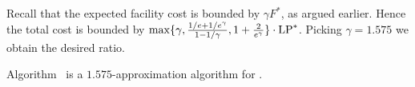 Recall that the expected facility cost is bounded by $\gamma F^\ast$,
as argued earlier. Hence the total cost is bounded by $\max\{\gamma,
\frac{1/e+1/e^\gamma}{1-1/\gamma}, 1+\frac{2}{e^\gamma}\}\cdot
\mbox{\rm LP}^\ast$. Picking $\gamma=1.575$ we obtain the desired ratio.


\begin{theorem}\label{thm:ebgs}
  Algorithm~{\EBGS} is a $1.575$-approximation algorithm for \FTFP.
\end{theorem}



